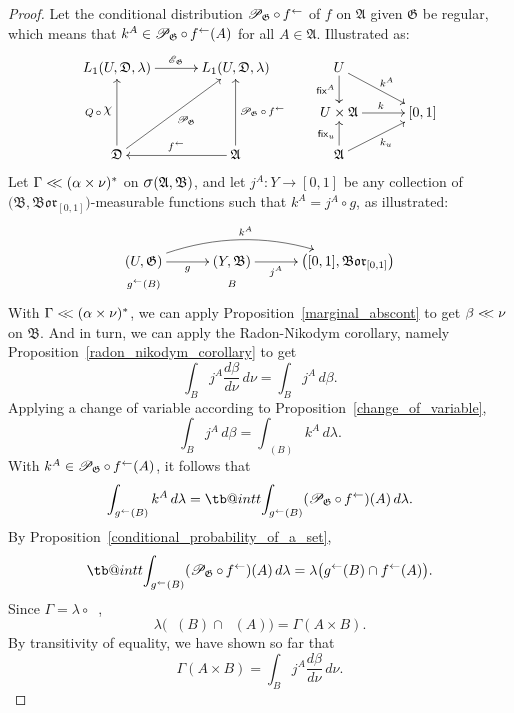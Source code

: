 \documentclass[
twoside=true,
paper=letter,
fontsize=9pt,
pagesize=auto,
leqno,
openany,
headsepline,
overfullrule,
]{scrbook}
\makeatletter
\theoremstyle{plain}
\theoremstyle{plain}
\theoremstyle{definition}
\theoremstyle{bfnoteitalic}
\theoremstyle{bfnoteroman}
\newcommand{\sigalg}[1]{\mathfrak{#1}}
\newcommand{\cali}[1]{\mathscr{#1}}
\newcommand{\sfop}[1]{\mathsf{#1}}
\newcommand{\condexpop}[1]{\mathop{\cali{E}\hspace{-1pt}}\nolimits_{#1}}
\newcommand{\condprobop}[1]{\mathop{\cali{P}\hspace{-1pt}}\nolimits_{#1}}
\newcommand{\borel}{\mathfrak{Bor}}
\newcommand{\sagb}{\mathop{\hbox{\large{$\sigma$}}}\nolimits}
\newcommand{\charfunction}[1]{\mathop{{\raisebox{2pt}{$\chi$}}_{#1}}}
\newcommand{\preimage}[1]{\mathop{#1^{\leftarrow}}}
\newcommand{\meets}{\cap}
\newcommand{\sigmaalgebra}{\sigalg{A}}
\newcommand{\sigmaalgebraii}{\sigalg{B}}
\newcommand{\productsig}[2]{\sagb(#1,#2)}
\newcommand{\funcf}{f}
\newcommand{\funcg}{g}
\newcommand{\funcj}{j}
\newcommand{\funck}{k}
\newcommand{\function}{f}
\newcommand{\measurespaceii}{Y}
\newcommand{\abscont}{\mathrel{< \kern-3.5pt <}}
\newcommand{\measnu}{\nu}
\newcommand{\measureiii}{\lambda}
\newcommand{\measlambda}{\lambda}
\newcommand{\seti}{A}
\newcommand{\setii}{B}
\newcommand{\fixinthefirst}[1]{\sfop{fix}_{#1}}
\newcommand{\fixinthesecond}[1]{\sfop{fix}^{#1}}
\newcommand{\uspace}{U}%
\newcommand{\uspaceelt}{u}
\newcommand{\uspacesig}{\sigalg{D}}
\newcommand{\measonprod}{\Gamma}%
\newcommand{\marginalone}{\alpha}%
\newcommand{\marginaltwo}{\beta}%
\newcommand\tint{\mathop{\mathpalette\tb@int{t}}\!\int}
\newcommand\tb@int[2]{%
  \sbox\z@{$\m@th#1\int$}%
  \if#2t%
    \rlap{\hbox to\wd\z@{%
      \hfil
      \vrule width .35em height \dimexpr\ht\z@+1.4pt\relax depth -\dimexpr\ht\z@+1pt\relax
      \kern.05em %
    }}
  \else
    \rlap{\hbox to\wd\z@{%
      \vrule width .35em height -\dimexpr\dp\z@+1pt\relax depth \dimexpr\dp\z@+1.4pt\relax
      \hfil
    }}
  \fi
}
\newcommand{\inducedint}{\tint}
\makeatother
\begin{document}
\begin{proof}
Let the conditional distribution
$\condprobop{\sigalg{G}}\circ \preimage{\funcf}$ of $\funcf$ on
$\sigmaalgebra$ given $\sigalg{G}$ be regular, which means that
$\funck^\seti \in \condprobop{\sigalg{G}}\circ \preimage{\funcf}(\seti)$ for all
$\seti\in\sigmaalgebra$. Illustrated as:
\[%
\xymatrix@R=16pt@C=30pt{
L_1(\uspace, \uspacesig, \measureiii) \ar[r]^{\condexpop{\sigalg{G}}}
& L_1(\uspace, \uspacesig, \measureiii)
& \uspace
\ar[d]_-{\fixinthesecond{\seti}}
\ar[dr]^{\funck^\seti}
\\
&
& \uspace\times\sigmaalgebra \ar[r]^{\funck}
& [0,1]
\\
\uspacesig
\ar[uu]^{Q\,\circ\,\charfunction{}}
\ar[uur]_{\condprobop{\sigalg{G}}}
& \sigmaalgebra
\ar[uu]_{\condprobop{\sigalg{G}}\circ \preimage{\function}}
\ar[l]_{\preimage{\function}}
& \sigmaalgebra
\ar[u]^{\fixinthefirst{\uspaceelt}}
\ar[ur]_{\funck_\uspaceelt}
&
\\
}
\]
Let
$\measonprod \abscont (\marginalone\times\measnu)^*$
on
$\productsig{\sigmaalgebra}{\sigmaalgebraii}$,
and let
$\funcj^\seti : \measurespaceii \to [0,1]$
be any collection of
$\bigl( \sigmaalgebraii,\borel_{[0,1]} \bigr)$\hyp{}measurable
functions such that
$\funck^\seti = \funcj^\seti \circ \funcg$, as illustrated:
\[
\xymatrix@R=0pt@C=30pt{
(\uspace,\sigalg{G})
\ar[r]_-{\funcg} \ar@/^16pt/[rr]^{\funck^\seti}
& (\measurespaceii,\sigmaalgebraii)
\ar[r]_-{\funcj^\seti}
& \bigl( [0,1], \borel_{[0,1]} \bigr) \\
\scriptstyle{\preimage{\funcg}(\setii)} & \scriptstyle{\setii} & \\
}
\]
With
$\measonprod\abscont(\marginalone\times\measnu)^*$,
we can apply Proposition~\ref{marginal_abscont} to get
$\marginaltwo\abscont\measnu$ on $\sigmaalgebraii$.
And in turn, we can apply the Radon-Nikodym corollary, namely Proposition~\ref{radon_nikodym_corollary} to get
\[
\int_\setii \funcj^\seti  \dfrac{d\marginaltwo}{d\measnu} \, d \measnu
=
\int_\setii \funcj^\seti \, d \marginaltwo.
\]
Applying a change of variable according to Proposition~\ref{change_of_variable},
\[
\int_\setii \funcj^\seti \, d \marginaltwo
=
\int_{\preimage{\funcg}(\setii)}
\funck^\seti \, d\measlambda.
\]
With
$\funck^\seti \in \condprobop{\sigalg{G}}\circ \preimage{\funcf}(\seti)$,
it follows that
\[
\int_{\preimage{\funcg}(\setii)}
\funck^\seti \, d\measlambda
=
\inducedint_{\preimage{\funcg}(\setii)}
(\condprobop{\sigalg{G}}\circ \preimage{\funcf})(\seti)\,d\measlambda.
\]
By Proposition~\ref{conditional_probability_of_a_set},
\[
\inducedint_{\preimage{\funcg}(\setii)}
(\condprobop{\sigalg{G}}\circ \preimage{\funcf})(\seti)\,d\measlambda
=
\measlambda\bigl(\preimage{\funcg}(\setii)\meets\preimage{\funcf}(\seti)\bigr).
\]
Since
$\measonprod =
\measlambda\circ\preimage{({\funcf,\funcg})}$,
\[
\measlambda\bigl(\preimage{\funcg}(\setii)\meets\preimage{\funcf}(\seti)\bigr)
=
\measonprod(\seti\times\setii).
\]
By transitivity of equality, we have shown so far that
\[
\measonprod(\seti\times\setii)
=
\int_\setii \funcj^\seti  \dfrac{d\marginaltwo}{d\measnu} \, d \measnu.
\]


\end{proof}
\end{document}
